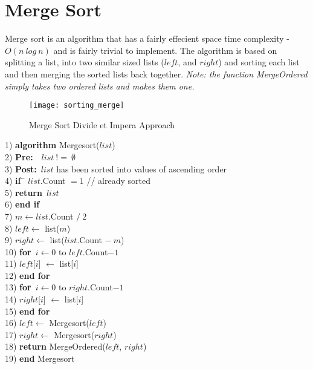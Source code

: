 \section{Merge Sort}
Merge sort is an algorithm that has a fairly effecient space time complexity - $O(n~log~n)$ and is fairly trivial to implement. The algorithm is based on splitting a list, into two similar sized lists ($left$, and $right$) and sorting each list and then merging the sorted lists back together. \textit{Note: the function MergeOrdered simply takes two ordered lists and makes them one.}

\begin{figure}[h]
\begin{center}
\texttt{[image: sorting\_merge]}
\end{center}
\caption{Merge Sort Divide et Impera Approach} \label{fig:sorting_merge}
\end{figure}

\begin{tabbing}
1)  \textbf{alg}\= \textbf{orithm} Mergesort($list$) \\
2)  \> \textbf{Pre:}~~$list~!=~\emptyset$ \\
3)  \> \textbf{Post:}~$list$ has been sorted into values of ascending order \\
4)  \> \textbf{if}~\= $list$.Count $= 1$ // already sorted \\
5)  \> \> \textbf{return}~$list$ \\
6)  \> \textbf{end if} \\
7)  \> $m \leftarrow list$.Count $/~2$ \\
8)  \> $left \leftarrow$ list($m$) \\
9)  \> $right \leftarrow$ list($list$.Count $-~m$) \\
10) \> \textbf{for}\=~$i \leftarrow 0$ to $left$.Count$-1$ \\
11) \> \> $left$[$i$] $\leftarrow$ list[$i$] \\
12) \> \textbf{end for} \\
13) \> \textbf{for}\=~$i \leftarrow 0$ to $right$.Count$-1$ \\
14) \> \> $right$[$i$] $\leftarrow$ list[$i$] \\
15) \> \textbf{end for} \\
16) \> $left \leftarrow$ Mergesort($left$) \\
17) \> $right \leftarrow$ Mergesort($right$) \\
18) \> \textbf{return} MergeOrdered($left$, $right$) \\
19) \textbf{end} Mergesort \\
\end{tabbing}

